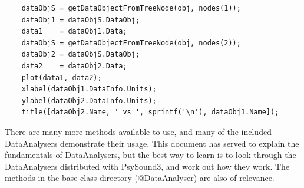 \documentclass{article}
\begin{document}
\begin{verbatim} 
	dataObjS = getDataObjectFromTreeNode(obj, nodes(1));  
	dataObj1 = dataObjS.DataObj;
	data1    = dataObj1.Data;
	dataObjS = getDataObjectFromTreeNode(obj, nodes(2));
	dataObj2 = dataObjS.DataObj;
	data2    = dataObj2.Data;
	plot(data1, data2);
	xlabel(dataObj1.DataInfo.Units);
	ylabel(dataObj2.DataInfo.Units);
	title([dataObj2.Name, ' vs ', sprintf('\n'), dataObj1.Name]);
\end{verbatim}

There are many more methods available to use, and many of the included  DataAnalysers demonstrate their usage. This document has served to explain the fundamentals of DataAnalysers, but the best way to learn is to look through the DataAnalysers distributed with PsySound3, and work out how they work. The methods in the base class directory (@DataAnalyser) are also of relevance.
\end{document}
